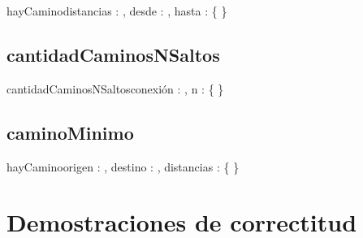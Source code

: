 \documentclass[10pt,a4paper]{article}
\begin{document}
\begin{proc}{hayCamino}{\In distancias : \TLista{\TLista{\ent}}, \In desde : \ent, \In hasta : \ent}{\bool \{ } 
	\asegura{\{\True\}}
	\}
\end{proc}

\subsection{cantidadCaminosNSaltos}

\begin{proc}{cantidadCaminosNSaltos}{\Inout conexión : \TLista{\TLista{\ent}}, \In n : \ent}{ \{ } 
	\requiere{\{ \True\}}
	\asegura{\{\True\}}
	\}
\end{proc}

\subsection{caminoMinimo}

\begin{proc}{hayCamino}{\In origen : \ent, \In destino : \ent, \In distancias : \TLista{\TLista{\ent}}}{\TLista{\ent} \{ } 
	\requiere{\{ \True \}}
	\asegura{\{\True\}}
	\}
\end{proc}

\section{Demostraciones de correctitud}
\end{document}
